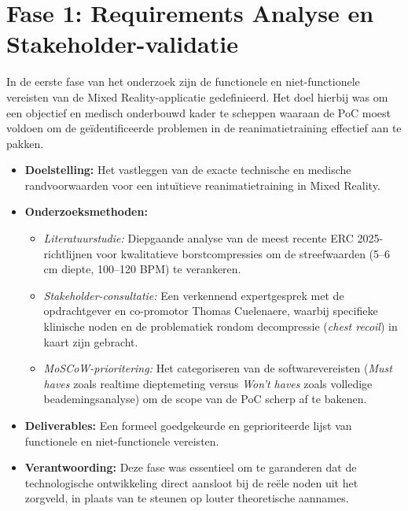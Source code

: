 \section{Fase 1: Requirements Analyse en Stakeholder-validatie}
In de eerste fase van het onderzoek zijn de functionele en niet-functionele vereisten van de Mixed Reality-applicatie gedefinieerd. 
Het doel hierbij was om een objectief en medisch onderbouwd kader te scheppen waaraan de PoC moest voldoen om de geïdentificeerde problemen in 
de reanimatietraining effectief aan te pakken.
\begin{itemize}
    \item \textbf{Doelstelling:} Het vastleggen van de exacte technische en medische randvoorwaarden voor een intuïtieve reanimatietraining in Mixed Reality.
    \item \textbf{Onderzoeksmethoden:} 
        \begin{itemize}
            \item \textit{Literatuurstudie:} Diepgaande analyse van de meest recente ERC 2025-richtlijnen voor kwalitatieve borstcompressies om de streefwaarden 
            (5--6 cm diepte, 100--120 BPM) te verankeren.
            \item \textit{Stakeholder-consultatie:} Een verkennend expertgesprek met de opdrachtgever en co-promotor Thomas Cuelenaere, waarbij specifieke klinische 
            noden en de problematiek rondom decompressie (\textit{chest recoil}) in kaart zijn gebracht.
            \item \textit{MoSCoW-prioritering:} Het categoriseren van de softwarevereisten (\textit{Must haves} zoals realtime dieptemeting versus \textit{Won't haves} 
            zoals volledige beademingsanalyse) om de scope van de PoC scherp af te bakenen.
        \end{itemize}
    \item \textbf{Deliverables:} Een formeel goedgekeurde en geprioriteerde lijst van functionele en niet-functionele vereisten.
    \item \textbf{Verantwoording:} Deze fase was essentieel om te garanderen dat de technologische ontwikkeling direct aansloot bij de 
    reële noden uit het zorgveld, in plaats van te steunen op louter theoretische aannames.
\end{itemize}

